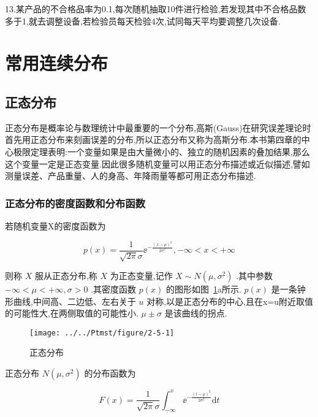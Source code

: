 13.某产品的不合格品率为0.1,每次随机抽取10件进行检验,若发现其中不合格品数多于1,就去调整设备,若检验员每天检验4次,试同每天平均要调整几次设备.

\section{常用连续分布}

\subsection{正态分布}

正态分布是概率论与数理统计中最重要的一个分布,高斯(Gauss)在研究误差理论时首先用正态分布来刻画误差的分布,所以正态分布又称为高斯分布.本书第四章的中心极限定理表明:一个变量如果是由大量微小的、独立的随机因素的叠加结果,那么这个变量一定是正态变量.因此很多随机变量可以用正态分布描述或近似描述,譬如测量误差、产品重量、人的身高、年降雨量等都可用正态分布描述.

\subsubsection{正态分布的密度函数和分布函数}

若随机变量X的密度函数为

\begin{equation}
p(x)=\frac{1}{\sqrt{2 \pi} \sigma} \ee ^{-\frac{(x-\mu)^{2}}{2 \sigma^{2}}},-\infty<x<+\infty \label{eq:2.5.1}
\end{equation}

则称 $ X $ 服从正态分布,称 $ X $ 为正态变量,记作 $ X \sim N\left(\mu, \sigma^{2}\right) $ .其中参数 $ -\infty< \mu<+\infty, \sigma>0 $ .其密度函数 $ p(x) $ 的图形如图~\ref{fig:2-5-1}a所示. $ p(x) $ 是一条钟形曲线,中间高、二边低、左右关于 $ u $ 对称,以是正态分布的中心,且在x=u附近取值的可能性大,在两侧取值的可能性小. $ \mu \pm \sigma $ 是该曲线的拐点.

\begin{figure}
	\centering
	\texttt{[image: ../../Ptmst/figure/2-5-1]}
	\caption{正态分布}
	\label{fig:2-5-1}
\end{figure}

正态分布 $ N\left(\mu, \sigma^{2}\right) $ 的分布函数为

\begin{equation}
F(x)=\frac{1}{\sqrt{2 \pi} \sigma} \int_{-\infty}^{x} \ee ^{-\frac{(t-\mu)^{2}}{2 \sigma^{2}}} \mathrm{d} t \label{eq:2.5.2}
\end{equation}

